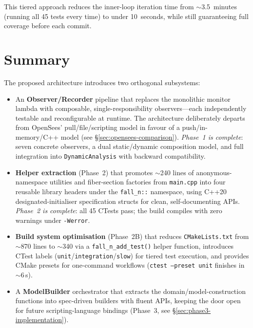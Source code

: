 This tiered approach reduces the inner-loop iteration time from
$\sim$3.5~minutes (running all 45 tests every time) to under
10~seconds, while still guaranteeing full coverage before each commit.


\section{Summary}
\label{sec:obs-summary}

The proposed architecture introduces two orthogonal subsystems:
\begin{itemize}
  \item An \textbf{Observer/Recorder} pipeline that replaces the
        monolithic monitor lambda with composable, single-responsibility
        observers---each independently testable and reconfigurable at
        runtime.  The architecture deliberately departs from OpenSees'
        pull/file/scripting model in favour of a push/in-memory/C++
        model (see \S\ref{sec:opensees-comparison}).
        \emph{Phase~1 is complete}: seven concrete observers,
        a dual static/dynamic composition model, and full integration
        into \texttt{DynamicAnalysis} with backward compatibility.
  \item \textbf{Helper extraction} (Phase~2) that promotes $\sim$240
        lines of anonymous-namespace utilities and fiber-section
        factories from \texttt{main.cpp} into four reusable library
        headers under the \texttt{fall\_n::} namespace, using C++20
        designated-initialiser specification structs for clean,
        self-documenting APIs.  \emph{Phase~2 is complete}: all 45
        CTests pass; the build compiles with zero warnings under
        \texttt{-Werror}.
  \item \textbf{Build system optimisation} (Phase~2B) that reduces
        \texttt{CMakeLists.txt} from $\sim$870 lines to $\sim$340 via
        a \texttt{fall\_n\_add\_test()} helper function, introduces
        CTest labels (\texttt{unit}/\texttt{integration}/\texttt{slow})
        for tiered test execution, and provides CMake presets for
        one-command workflows (\texttt{ctest --preset unit} finishes
        in $\sim$6\,s).
  \item A \textbf{ModelBuilder} orchestrator that extracts
        the domain/model-construction functions into spec-driven
        builders with fluent APIs, keeping the door open for
        future scripting-language bindings
        (Phase~3, see \S\ref{sec:phase3-implementation}).
\end{itemize}

